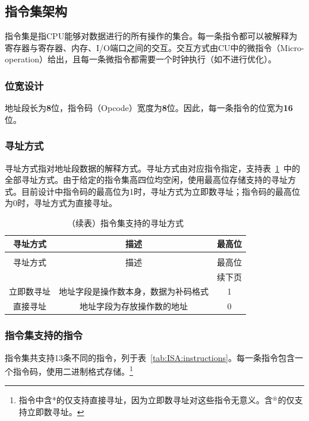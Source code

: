 \documentclass[lang=cn,a4paper,newtx]{elegantpaper}
\begin{document}
\subsection{指令集架构}
指令集是指CPU能够对数据进行的所有操作的集合。每一条指令都可以被解释为寄存器与寄存器、内存、I/O端口之间的交互。交互方式由CU中的微指令（Micro-operation）给出，且每一条微指令都需要一个时钟执行（如不进行优化）。
\subsubsection{位宽设计}
地址段长为\textbf{8}位，指令码（Opcode）宽度为\textbf{8}位。因此，每一条指令的位宽为\textbf{16}位。
\subsubsection{寻址方式}
寻址方式指对地址段数据的解释方式。寻址方式由对应指令指定，支持表~\ref{tab:ISA:addressingmode}~中的全部寻址方式。由于给定的指令集高四位均空闲，使用最高位存储支持的寻址方式。目前设计中指令码的最高位为1时，寻址方式为立即数寻址；指令码的最高位为0时，寻址方式为直接寻址。
\begin{longtable}{c c c}
  \caption{指令集支持的寻址方式} \label{tab:ISA:addressingmode} \\
  \toprule
  寻址方式  & 描述 & 最高位\\
  \midrule
  \endfirsthead
  
  \caption[]{（续表）指令集支持的寻址方式} \\
  \toprule
  寻址方式  & 描述 & 最高位\\
  \midrule
  \endhead
  
  \midrule
  \multicolumn{3}{r}{续下页} \\
  \midrule
  \endfoot
  
  \bottomrule
  \endlastfoot
  
  立即数寻址   &  地址字段是操作数本身，数据为补码格式  & 1\\
  直接寻址 &  地址字段为存放操作数的地址    & 0\\
\end{longtable}

\subsubsection{指令集支持的指令}
指令集共支持13条不同的指令，列于表~\ref{tab:ISA:instructions}。每一条指令包含一个指令码，使用二进制格式存储。\footnote{指令中含*的仅支持直接寻址，因为立即数寻址对这些指令无意义。含$^\circledast$的仅支持立即数寻址。}
  
\end{document}
